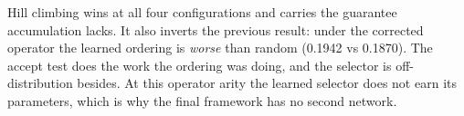 Hill climbing wins at all four configurations and carries the guarantee
accumulation lacks. It also inverts the previous result: under the corrected
operator the learned ordering is \emph{worse} than random (0.1942 vs 0.1870).
The accept test does the work the ordering was doing, and the selector is
off-distribution besides. At this operator arity the learned selector does not
earn its parameters, which is why the final framework has no second network.

